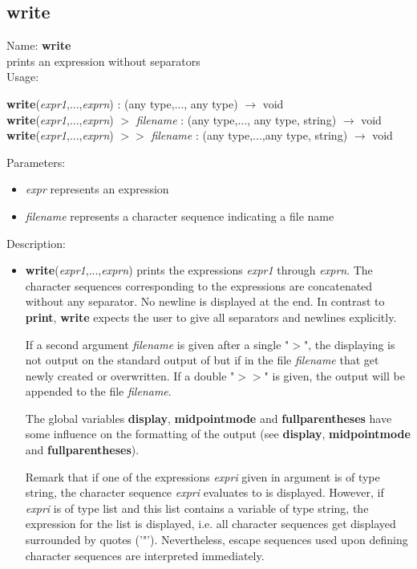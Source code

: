 \subsection{write}
\label{labwrite}
\noindent Name: \textbf{write}\\
prints an expression without separators\\

\noindent Usage: 
\begin{center}
\textbf{write}(\emph{expr1},...,\emph{exprn}) : (\textsf{any type},..., \textsf{any type}) $\rightarrow$ \textsf{void}\\
\textbf{write}(\emph{expr1},...,\emph{exprn}) $>$ \emph{filename} : (\textsf{any type},..., \textsf{any type}, \textsf{string}) $\rightarrow$ \textsf{void}\\
\textbf{write}(\emph{expr1},...,\emph{exprn}) $>>$ \emph{filename} : (\textsf{any type},...,\textsf{any type}, \textsf{string}) $\rightarrow$ \textsf{void}\\
\end{center}
Parameters: 
\begin{itemize}
\item \emph{expr} represents an expression
\item \emph{filename} represents a character sequence indicating a file name
\end{itemize}
\noindent Description: \begin{itemize}

\item \textbf{write}(\emph{expr1},...,\emph{exprn}) prints the expressions \emph{expr1} through
   \emph{exprn}. The character sequences corresponding to the expressions are
   concatenated without any separator. No newline is displayed at the
   end.  In contrast to \textbf{print}, \textbf{write} expects the user to give all
   separators and newlines explicitly.
    
   If a second argument \emph{filename} is given after a single "$>$", the
   displaying is not output on the standard output of \sollya but if in
   the file \emph{filename} that get newly created or overwritten. If a double
    "$>>$" is given, the output will be appended to the file \emph{filename}.
    
   The global variables \textbf{display}, \textbf{midpointmode} and \textbf{fullparentheses} have
   some influence on the formatting of the output (see \textbf{display},
   \textbf{midpointmode} and \textbf{fullparentheses}).
    
   Remark that if one of the expressions \emph{expri} given in argument is of
   type \textsf{string}, the character sequence \emph{expri} evaluates to is
   displayed. However, if \emph{expri} is of type \textsf{list} and this list
   contains a variable of type \textsf{string}, the expression for the list
   is displayed, i.e.  all character sequences get displayed surrounded
   by quotes ('"'). Nevertheless, escape sequences used upon defining
   character sequences are interpreted immediately.
\end{itemize}
